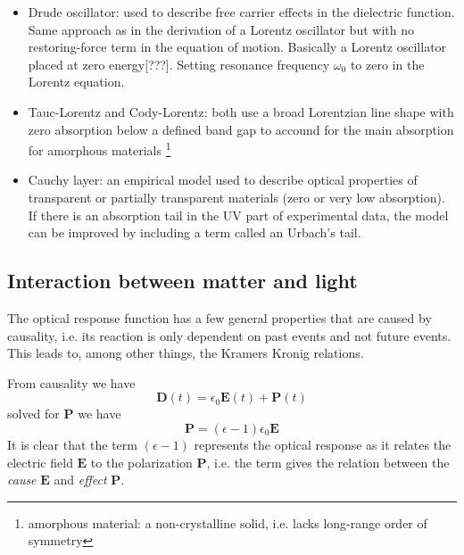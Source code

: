 \begin{itemize}
    \item Drude oscillator: used to describe free carrier effects in the dielectric function. Same approach as in the derivation of a Lorentz oscillator but with no restoring-force term in the equation of motion. Basically a Lorentz oscillator placed at zero energy[???]. Setting resonance frequency $\omega_0$ to zero in the Lorentz equation.
    
    \item Tauc-Lorentz and Cody-Lorentz: both use a broad Lorentzian line shape with zero absorption below a defined band gap to accound for the main absorption for amorphous materials \footnote{amorphous material: a non-crystalline solid, i.e. lacks long-range order of symmetry}
    
    \item Cauchy layer: an empirical model used to describe optical properties of transparent or partially transparent materials (zero or very low absorption). If there is an absorption tail in the UV part of experimental data, the model can be improved by including a term called an Urbach's tail.
\end{itemize}

\subsection{Interaction between matter and light}


The optical response function has a few general properties that are caused by causality, i.e. its reaction is only dependent on past events and not future events. This leads to, among other things, the Kramers Kronig relations. 

From causality we have
\begin{equation}
    \mathbf{D}(t) = \epsilon_0 \mathbf{E}(t) + \mathbf{P}(t)
\end{equation}
solved for $\mathbf{P}$ we have 
\begin{equation}
    \mathbf{P} = (\epsilon-1)\epsilon_0 \mathbf{E}
\end{equation}
It is clear that the term $(\epsilon-1)$ represents the optical response as it relates the electric field $\mathbf{E}$ to the polarization $\mathbf{P}$, i.e. the term gives the relation between the \emph{cause} $\mathbf{E}$ and \emph{effect} $\mathbf{P}$.

